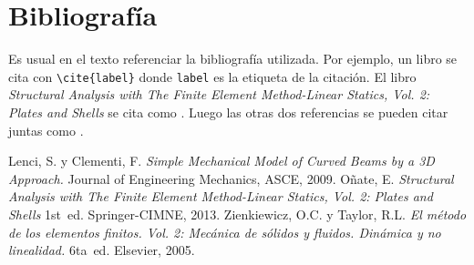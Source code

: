 \documentclass[a4paper,12pt]{article} %
\begin{document}
\newpage 


\section{Bibliografía}


Es usual en el texto referenciar la bibliografía utilizada. Por ejemplo, un libro se cita con \verb|\cite{label}| donde \verb|label| es la etiqueta de la citación. El libro \textit{Structural Analysis with The Finite Element Method-Linear Statics, Vol. 2: Plates and Shells} se cita como \cite{Onate}. Luego las otras dos referencias se pueden citar juntas como \cite{Lenci,Zienkiewicz}.






\begin{thebibliography}{5} %
\thispagestyle{empty}
%
Lenci, S. y Clementi, F. \emph{Simple Mechanical Model of Curved Beams by a 3D Approach.} \relax Journal of Engineering Mechanics, ASCE, 2009.
%
Oñate, E. \emph{Structural Analysis with The Finite Element Method-Linear Statics,
Vol. 2: Plates and Shells} 1st~ed. \relax Springer-CIMNE, 2013.
%
Zienkiewicz, O.C. y Taylor, R.L. \emph{El método de los elementos finitos. Vol. 2: Mecánica de sólidos y fluidos. Dinámica y no linealidad.} 6ta~ed. \relax Elsevier, 2005.
%
\end{thebibliography}
\end{document}
